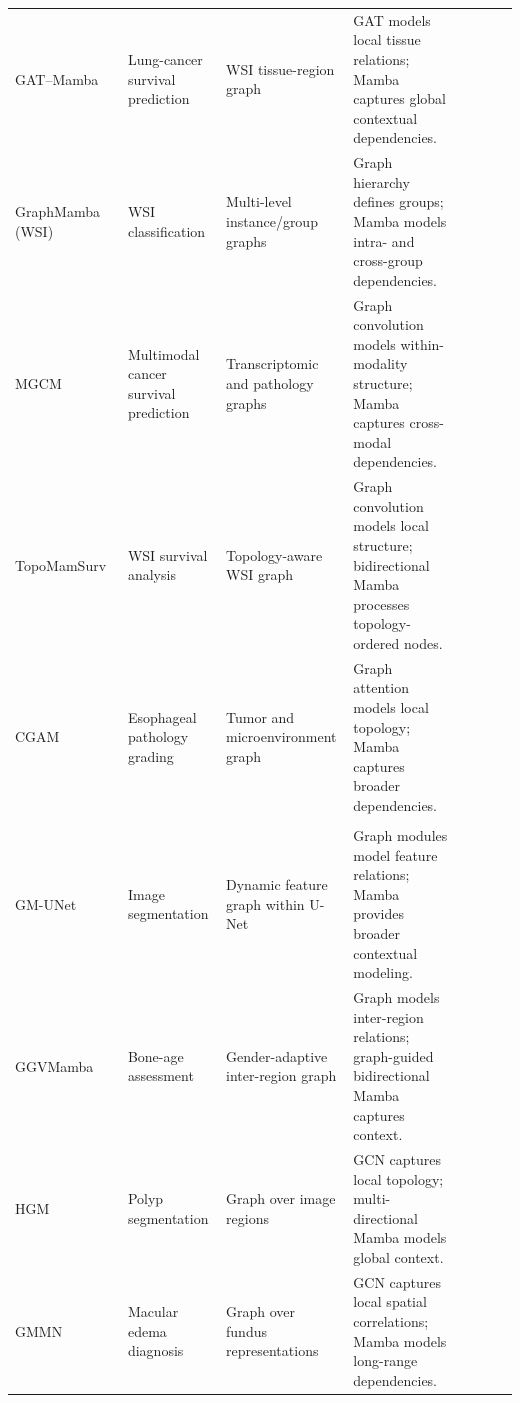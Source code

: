 \documentclass[acmsmall]{acmart}
\newcommand{\cmark}{\ding{51}}
\begin{document}
\begin{landscape}
\begin{longtable}{@{}
p{2.2cm}
p{2.8cm}
p{3.8cm}
p{7cm}
cccc
@{}}
GAT--Mamba~\cite{ding2024combining} &
Lung-cancer survival prediction &
WSI tissue-region graph &
GAT models local tissue relations; Mamba captures global contextual dependencies. &
& & & \cmark \\

GraphMamba (WSI)~\cite{zheng2025graphmamba} &
WSI classification &
Multi-level instance/group graphs &
Graph hierarchy defines groups; Mamba models intra- and cross-group dependencies. &
& & \cmark & \\

MGCM~\cite{cui2026mgcm} &
Multimodal cancer survival prediction &
Transcriptomic and pathology graphs &
Graph convolution models within-modality structure; Mamba captures cross-modal dependencies. &
\cmark & & & \\

TopoMamSurv~\cite{chen2026graph} &
WSI survival analysis &
Topology-aware WSI graph &
Graph convolution models local structure; bidirectional Mamba processes topology-ordered nodes. &
& & \cmark & \\

CGAM~\cite{qu2025cgam} &
Esophageal pathology grading &
Tumor and microenvironment graph &
Graph attention models local topology; Mamba captures broader dependencies. &
& & & \cmark \\


\midrule
\rowcolor{gray!12}
\multicolumn{8}{l}{\textbf{\textit{Medical imaging}}} \\

GM-UNet~\cite{zhang2024gm} &
Image segmentation &
Dynamic feature graph within U-Net &
Graph modules model feature relations; Mamba provides broader contextual modeling. &
& & & \cmark \\

GGVMamba~\cite{zhou2024efficient} &
Bone-age assessment &
Gender-adaptive inter-region graph &
Graph models inter-region relations; graph-guided bidirectional Mamba captures context. &
& & \cmark & \\

HGM~\cite{zhu2025hybrid} &
Polyp segmentation &
Graph over image regions &
GCN captures local topology; multi-directional Mamba models global context. &
& & & \cmark \\

GMMN~\cite{zhang2026graph} &
Macular edema diagnosis &
Graph over fundus representations &
GCN captures local spatial correlations; Mamba models long-range dependencies. &
& & & \cmark \\


\end{longtable}
\end{landscape}
\end{document}
